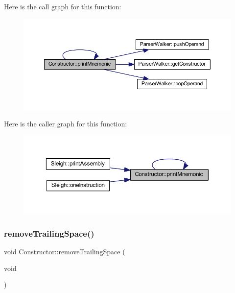 Here is the call graph for this function\+:
\nopagebreak
\begin{figure}[H]
\begin{center}
\leavevmode
\includegraphics[width=350pt]{class_constructor_a17546bf5169b175426f056051d491ecd_cgraph}
\end{center}
\end{figure}
Here is the caller graph for this function\+:
\nopagebreak
\begin{figure}[H]
\begin{center}
\leavevmode
\includegraphics[width=350pt]{class_constructor_a17546bf5169b175426f056051d491ecd_icgraph}
\end{center}
\end{figure}
\mbox{\label{class_constructor_a4b6a4cd00ebf6d0e76f770e917e5ff72}} 
\subsubsection{\texorpdfstring{removeTrailingSpace()}{removeTrailingSpace()}}
{\footnotesize\ttfamily void Constructor\+::remove\+Trailing\+Space (\begin{DoxyParamCaption}\item[{void}]{ }\end{DoxyParamCaption})}



